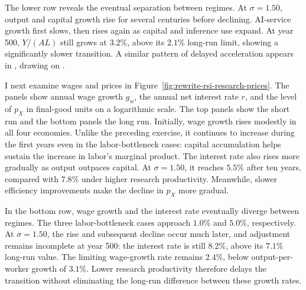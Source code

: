 The lower row reveals the eventual separation between regimes. At $\sigma=1.50$, output and capital growth rise for several centuries before declining. AI-service growth first slows, then rises again as capital and inference use expand. At year 500, $Y/(AL)$ still grows at $3.2\%$, above its $2.1\%$ long-run limit, showing a significantly slower transition.
A similar pattern of delayed acceleration appears in
\citet{jones2026future}, drawing on
\citet{jonestonetti2026}. %

I next examine wages and prices in Figure~\ref{fig:rewrite-rsi-research-prices}. The panels show annual wage growth $g_w$, the annual net interest rate $r$, and the level of $p_X$ in final-good units on a logarithmic scale. The top panels show the short run and the bottom panels the long run. Initially, wage growth rises modestly in all four economies. Unlike the preceding exercise, it continues to increase during the first years even in the labor-bottleneck cases: capital accumulation helps sustain the increase in labor's marginal product. The interest rate also rises more gradually as output outpaces capital. At $\sigma=1.50$, it reaches $5.5\%$ after ten years, compared with $7.8\%$ under higher research productivity. Meanwhile, slower efficiency improvements make the decline in $p_X$ more gradual.

In the bottom row, wage growth and the interest rate eventually diverge between regimes. The three labor-bottleneck cases approach $1.0\%$ and $5.0\%$, respectively. At $\sigma=1.50$, the rise and
subsequent decline occur much later, and adjustment remains incomplete at year 500: the interest rate is still $8.2\%$, above its $7.1\%$
long-run value. The limiting wage-growth rate remains $2.4\%$, below output-per-worker growth of $3.1\%$. Lower research productivity therefore delays the transition without eliminating the long-run difference between these growth rates. %

